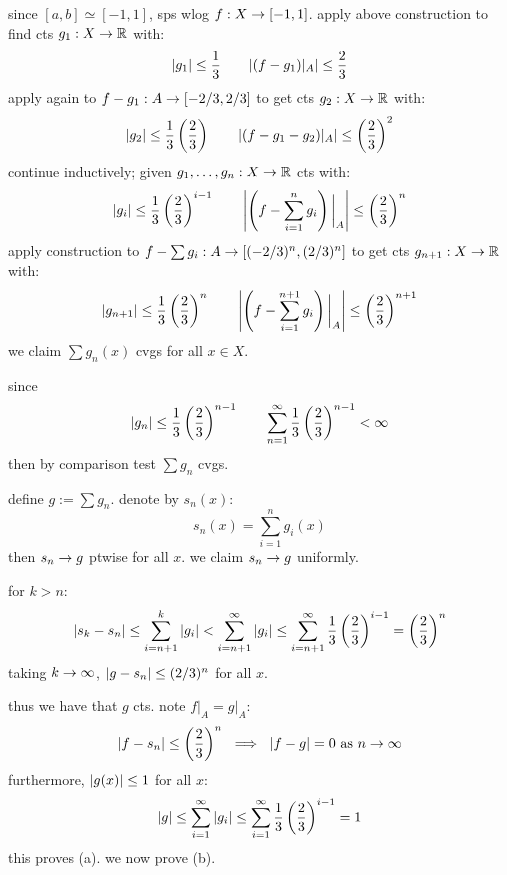 \newpage
since $[a,b]\simeq[-1,1]$, sps wlog $f:X\rightarrow[-1,1]$.
apply above construction to find cts $g_{1}:X\rightarrow\mathbb{R}$ with:
\begin{equation*}
    \abs{g_{1}}\leq\frac{1}{3} \qquad \abs{(f-g_{1})\rvert_{A}}\leq\frac{2}{3}
\end{equation*}
apply again to $f-g_{1}:A\rightarrow[-2/3,2/3]$ to get cts $g_{2}:X\rightarrow\mathbb{R}$ with:
\begin{equation*}
    \abs{g_{2}}\leq\frac{1}{3}\left( \frac{2}{3} \right) \qquad
    \abs{(f-g_{1}-g_{2})\rvert_{A}}\leq \left( \frac{2}{3} \right)^{2}
\end{equation*}
continue inductively; given $g_{1},\dots,g_{n}:X\rightarrow\mathbb{R}$ cts with:
\begin{equation*}
    \abs{g_{i}}\leq\frac{1}{3}\left( \frac{2}{3} \right)^{i-1} \qquad
    \abs{\left( f-\sum_{i=1}^{n}g_{i} \right)\bigg\rvert_{A}}\leq
    \left( \frac{2}{3} \right)^{n}
\end{equation*}
apply construction to $f-\sum g_{i}:A\rightarrow[(-2/3)^{n},(2/3)^{n}]$ to get
cts $g_{n+1}:X\rightarrow\mathbb{R}$ with:
\begin{equation*}
    \abs{g_{n+1}}\leq\frac{1}{3}\left( \frac{2}{3} \right)^{n} \qquad
    \abs{\left(f-\sum_{i=1}^{n+1}g_{i}\right)\bigg\rvert_{A}}\leq
    \left( \frac{2}{3} \right)^{n+1}
\end{equation*}
we claim $\sum g_{n}(x)$ cvgs for all $x\in X$.
\begin{block}
    since
    \begin{equation*}
        \abs{g_{n}}\leq\frac{1}{3}\left( \frac{2}{3} \right)^{n-1} \qquad
        \sum_{n=1}^{\infty}\frac{1}{3}\left( \frac{2}{3} \right)^{n-1}<\infty
    \end{equation*}
    then by comparison test $\sum g_{n}$ cvgs.
\end{block}
define $g:=\sum g_{n}$. denote by $s_{n}(x)$:
\begin{equation*}
    s_{n}(x)=\sum_{i=1}^{n}g_{i}(x)
\end{equation*}
then $s_{n}\rightarrow g$ ptwise for all $x$.
we claim $s_{n}\rightarrow g$ uniformly.
\begin{block}
    for $k>n$:
    \begin{equation*}
        \abs{s_{k}-s_{n}}\leq\sum_{i=n+1}^{k}\abs{g_{i}}
        <\sum_{i=n+1}^{\infty}\abs{g_{i}}
        \leq\sum_{i=n+1}^{\infty}\frac{1}{3}\left( \frac{2}{3} \right)^{i-1}
        =\left( \frac{2}{3} \right)^{n}
    \end{equation*}
    taking $k\rightarrow\infty$, $\abs{g-s_{n}}\leq(2/3)^{n}$ for all $x$.
\end{block}
thus we have that $g$ cts.
note $f\rvert_{A}=g\rvert_{A}$:
\begin{equation*}
    \abs{f-s_{n}}\leq \left( \frac{2}{3} \right)^{n} \ \implies \
    \abs{f-g}=0 \textrm{ as } n\rightarrow\infty
\end{equation*}
furthermore, $\abs{g(x)}\leq1$ for all $x$:
\begin{equation*}
    \abs{g}\leq\sum_{i=1}^{\infty}\abs{g_{i}}\leq\sum_{i=1}^{\infty}
    \frac{1}{3}\left( \frac{2}{3} \right)^{i-1}=1
\end{equation*}
this proves (a). we now prove (b).

